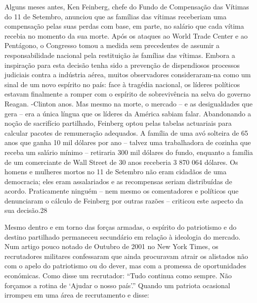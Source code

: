  \par 
Alguns meses antes, Ken Feinberg, chefe do Fundo de Compensação das Vítimas do {\color{blue}11} de Setembro, anunciou que as famílias das vítimas receberiam uma compensação pelas suas perdas com base, em parte, no salário que cada vítima recebia no momento da sua morte. Após os ataques ao World Trade Center e ao Pentágono, o Congresso tomou a medida sem precedentes de assumir a responsabilidade nacional pela restituição às famílias das vítimas. Embora a inspiração para esta decisão tenha sido a prevenção de dispendiosos processos judiciais contra a indústria aérea, muitos observadores consideraram-na como um sinal de um novo espírito no país: face à tragédia nacional, os líderes políticos estavam finalmente a romper com o espírito de sobrevivência na selva do governo Reagan. -Clinton anos. Mas mesmo na morte, o mercado – e as desigualdades que gera – era a única língua que os líderes da América sabiam falar. Abandonando a noção de sacrifício partilhado, Feinberg optou pelas tabelas actuariais para calcular pacotes de remuneração adequados. A família de uma avó solteira de {\color{blue}65} anos que ganha {\color{blue}10} mil dólares por ano – talvez uma trabalhadora de cozinha que receba um salário mínimo – retiraria {\color{blue}300} mil dólares do fundo, enquanto a família de um comerciante de Wall Street de {\color{blue}30} anos receberia {\color{blue}3} {\color{blue}870} 064 dólares. Os homens e mulheres mortos no {\color{blue}11} de Setembro não eram cidadãos de uma democracia; eles eram assalariados e as recompensas seriam distribuídas de acordo. Praticamente ninguém – nem mesmo os comentadores e políticos que denunciaram o cálculo de Feinberg por outras razões – criticou este aspecto da sua decisão.{\color{blue}28}
 \par 
Mesmo dentro e em torno das forças armadas, o espírito do patriotismo e do destino partilhado permaneceu secundário em relação à ideologia do mercado. Num artigo pouco notado de Outubro de 2001 no New York Times, os recrutadores militares confessaram que ainda procuravam atrair os alistados não com o apelo do patriotismo ou do dever, mas com a promessa de oportunidades económicas. Como disse um recrutador: “Tudo continua como sempre. Não forçamos a rotina de ‘Ajudar o nosso país’.” Quando um patriota ocasional irrompeu em uma área de recrutamento e disse:
 \par 
